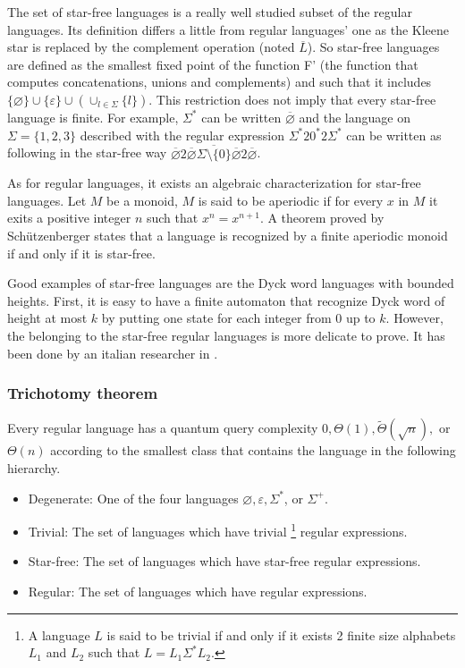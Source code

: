 The set of star-free languages is a really well studied subset of the regular languages.
Its definition differs a little from regular languages' one as the Kleene star is replaced
by the complement operation (noted $\overline{L}$). So star-free languages are defined
as the smallest fixed point of the function F' (the function that computes concatenations, unions
and complements) and such that it includes
$\{\varnothing\} \cup \{\varepsilon\} \cup(\cup_{l\in\Sigma}\{l\})$.
This restriction does not imply that every star-free language is finite.
For example, $\Sigma^*$ can be written $\overline{\varnothing}$ and the
language on $\Sigma = \{1, 2, 3\}$ described with the regular expression
$\Sigma^*20^*2\Sigma^*$ can be written as following in the star-free way
$\overline{\varnothing}2\overline{\overline{\varnothing}\Sigma{\setminus}
        \{0\}\overline{\varnothing}}2\overline{\varnothing}$.

As for regular languages, it exists an algebraic characterization for star-free
languages. Let $M$ be a monoid, $M$ is said to be aperiodic if for every $x$ in
$M$ it exits a positive integer $n$ such that $x^n=x^{n+1}$. A theorem proved by
Schützenberger \cite{Schtzenberger1965OnFM} states that a language is recognized
by a finite aperiodic monoid if and only if it is star-free.

Good examples of star-free languages are the Dyck word languages with bounded
heights. First, it is easy to have a finite automaton that recognize Dyck word
of height at most $k$ by putting one state for each integer from 0 up to $k$.
However, the belonging to the star-free regular languages is more delicate to
prove. It has been done by an italian researcher in
\cite[1978]{dyck_height_bound_star_free}.

\subsubsection{Trichotomy theorem}

\begin{theorem}
    Every regular language has a quantum query complexity
    \(0,\Theta(1), \tilde{\Theta}(\sqrt{n}),\) or \(\Theta(n) \)
    according to the smallest class that contains
    the language in the following hierarchy.
    \begin{itemize}
        \item Degenerate: One of the four languages \(\varnothing, \varepsilon, \Sigma^*\), or \(\Sigma^+\).
        \item Trivial: The set of languages which have trivial
              \footnote{A language $L$ is said to be trivial if and only if it exists 2 finite size alphabets
                  $L_1$ and $L_2$ such that $L = L_1 \Sigma^* L_2$.}
              regular expressions.
        \item Star-free: The set of languages which have star-free regular expressions.
        \item Regular: The set of languages which have regular expressions.
    \end{itemize}
\end{theorem}

